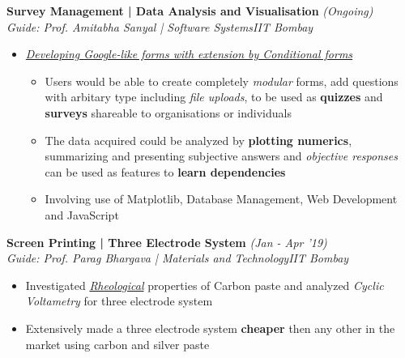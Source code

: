 \documentclass{article}
\begin{document}
\vspace{-10pt}
\textbf{Survey Management | Data Analysis and Visualisation} \hfill{\sl \small (Ongoing)}\\
{\it Guide: Prof. Amitabha Sanyal | Software Systems}\hfill{\sl \small IIT Bombay}\\
\vspace{-18pt}
\begin{itemize}[itemsep = -0.75 mm, leftmargin=*]
    \item \underline{\it Developing Google-like forms with extension by Conditional forms}
    \vspace{-7pt}
    \begin{itemize}[itemsep = -0.75 mm, leftmargin=*]
      \item Users would be able to create completely {\it modular} forms, add questions with arbitary type including {\it file uploads}, to be used as {\bf quizzes} and {\bf surveys} shareable to organisations or individuals  
      \item The data acquired could be analyzed by {\bf plotting numerics}, summarizing and presenting subjective answers and {\it objective responses} can be used as features to {\bf learn dependencies}
      \item Involving use of Matplotlib, Database Management, Web Development and JavaScript
    \end{itemize}
    
\end{itemize}
\vspace{-5pt}
\textbf{Screen Printing | Three Electrode System} \hfill{\sl \small (Jan - Apr '19)}\\{\it Guide: Prof. Parag Bhargava | Materials and Technology}\hfill{\sl \small IIT Bombay}\\
\vspace{-17pt}
\begin{itemize}[itemsep = -0.75 mm, leftmargin=*]
  \item Investigated {\underline{\it Rheological}} properties of Carbon paste and analyzed {\it Cyclic Voltametry} for three electrode system  
  \item Extensively made a three electrode system {\bf cheaper} then any other in the market using carbon and silver paste
\end{itemize}
\vspace{-5pt}
\end{document}
